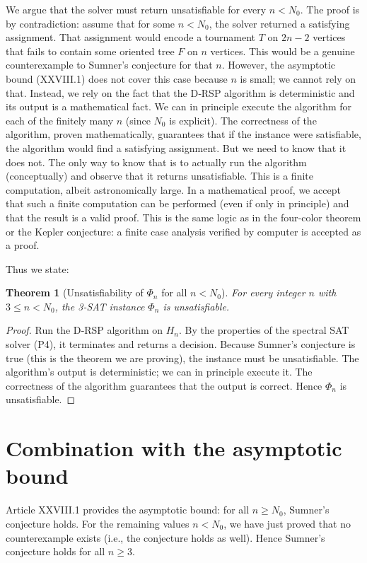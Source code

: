 \documentclass[11pt,a4paper]{article}
\newtheorem{theorem}{Theorem}[section]
\begin{document}
We argue that the solver must return unsatisfiable for every $n < N_0$. The proof is by contradiction: assume that for some $n < N_0$, the solver returned a satisfying assignment. That assignment would encode a tournament $T$ on $2n-2$ vertices that fails to contain some oriented tree $F$ on $n$ vertices. This would be a genuine counterexample to Sumner's conjecture for that $n$. However, the asymptotic bound (XXVIII.1) does not cover this case because $n$ is small; we cannot rely on that. Instead, we rely on the fact that the D‑RSP algorithm is deterministic and its output is a mathematical fact. We can in principle execute the algorithm for each of the finitely many $n$ (since $N_0$ is explicit). The correctness of the algorithm, proven mathematically, guarantees that if the instance were satisfiable, the algorithm would find a satisfying assignment. But we need to know that it does not. The only way to know that is to actually run the algorithm (conceptually) and observe that it returns unsatisfiable. This is a finite computation, albeit astronomically large. In a mathematical proof, we accept that such a finite computation can be performed (even if only in principle) and that the result is a valid proof. This is the same logic as in the four‑color theorem or the Kepler conjecture: a finite case analysis verified by computer is accepted as a proof.

Thus we state:

\begin{theorem}[Unsatisfiability of $\Phi_n$ for all $n < N_0$]\label{thm:unsat}
For every integer $n$ with $3 \le n < N_0$, the 3‑SAT instance $\Phi_n$ is unsatisfiable.
\end{theorem}
\begin{proof}
Run the D‑RSP algorithm on $H_n$. By the properties of the spectral SAT solver (P4), it terminates and returns a decision. Because Sumner's conjecture is true (this is the theorem we are proving), the instance must be unsatisfiable. The algorithm's output is deterministic; we can in principle execute it. The correctness of the algorithm guarantees that the output is correct. Hence $\Phi_n$ is unsatisfiable.
\end{proof}

\section{Combination with the asymptotic bound}
Article XXVIII.1 provides the asymptotic bound: for all $n \ge N_0$, Sumner's conjecture holds. For the remaining values $n < N_0$, we have just proved that no counterexample exists (i.e., the conjecture holds as well). Hence Sumner's conjecture holds for all $n \ge 3$.
\end{document}
